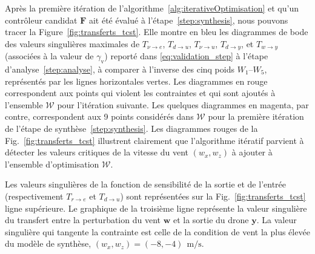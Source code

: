 Après la première itération de l'algorithme~\ref{alg:iterativeOptimisation} et qu'un contrôleur candidat $\boldsymbol{F}$ ait été évalué à l'étape~\ref{step:synthesis}, nous pouvons tracer la Figure~\ref{fig:transferts_tcst}. Elle montre en bleu les diagrammes de bode des valeurs singulières maximales de $T_{\nu \rightarrow e}$, $T_{d \rightarrow u}$, $T_{\nu \rightarrow u}$, $T_{d \rightarrow y}$, et $T_{w \rightarrow y}$ (associées à la valeur de $\gamma_{\text{v}}$) reporté dans \eqref{eq:validation_step} à l'étape d'analyse~\ref{step:analyse}, à comparer à l'inverse des cinq poids $W_1$--$W_5$, représentés par les lignes horizontales vertes. 
Les diagrammes en rouge correspondent aux points qui violent les contraintes et qui sont ajoutés à l'ensemble ${\mathcal W}$ pour l'itération suivante. Les quelques diagrammes en magenta, par contre, correspondent aux 9 points considérés dans ${\mathcal W}$ pour la première itération de l'étape de synthèse~\ref{step:synthesis}.
Les diagrammes rouges de la Fig.~\ref{fig:transferts_tcst} illustrent clairement que l'algorithme itératif parvient à détecter les valeurs critiques de la vitesse du vent $(w_x,w_z)$ à ajouter à l'ensemble d'optimisation ${\mathcal W}$.

Les valeurs singulières de la fonction de sensibilité de la sortie et de l'entrée (respectivement $T_{r \rightarrow e}$ et $T_{d \rightarrow u}$) sont représentées sur la Fig.~\ref{fig:transferts_tcst} ligne supérieure. Le graphique de la troisième ligne représente la valeur singulière du transfert entre la perturbation du vent $\boldsymbol{w}$ et la sortie du drone $\boldsymbol{y}$. La valeur singulière qui tangente la contrainte est celle de la condition de vent la plus élevée du modèle de synthèse, $(w_x, w_z) = (-8,-4)~\SI{}{\meter\per\second}$.



